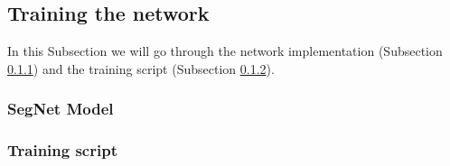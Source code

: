\subsection{Training the network}
\label{sec:training}
In this Subsection we will go through the network implementation (Subsection \ref{sec:model}) and the training script (Subsection \ref{sec:train_script}).

\subsubsection{SegNet Model}
\label{sec:model}


\subsubsection{Training script}
\label{sec:train_script}

